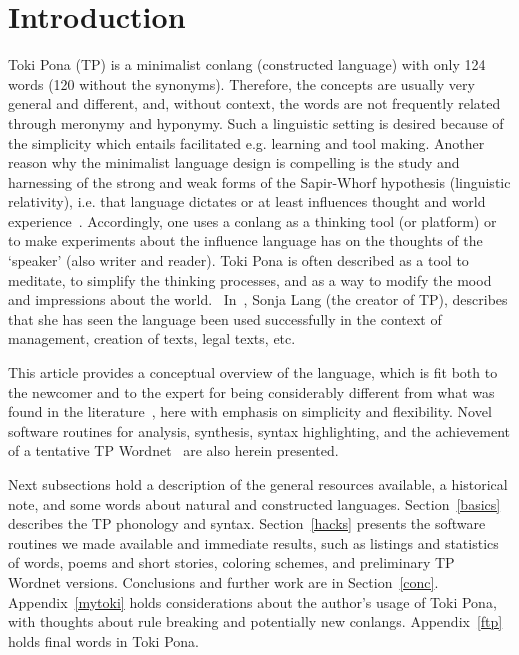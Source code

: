 \section{Introduction}\label{intro}
Toki Pona (TP) is a minimalist conlang (constructed language)
with only 124 words (120 without the synonyms).
Therefore, the concepts are usually very general and different,
and, without context, the words are not frequently related through
meronymy and hyponymy.
Such a linguistic setting is desired because of the simplicity
which entails facilitated e.g. learning and tool making.
Another reason why the minimalist language design is compelling
is the study and harnessing of the strong and weak forms of
the Sapir-Whorf hypothesis (linguistic relativity),
i.e. that language dictates or at least influences thought
and world experience~\cite{sapWho}.
Accordingly, one uses a conlang as a thinking tool (or platform)
or to make experiments about the influence language has on
the thoughts of the `speaker' (also writer and reader).
Toki Pona is often described as a tool to meditate,
to simplify the thinking processes, and as a way to modify
the mood and impressions about the world.~\cite{tpLang,kama,tp3,tp4}
In~\cite{interview}, Sonja Lang (the creator of TP),
describes that she has seen the language been used successfully
in the context of management, creation of texts, legal texts,
etc.

This article provides a conceptual overview of the language,
which is fit both to the newcomer and to the expert
for being considerably different
from what was found in the literature~\cite{tpLang,kama,memrise},
here with emphasis on simplicity and flexibility.
Novel software routines for analysis, synthesis,
syntax highlighting, and the achievement of a tentative TP
Wordnet~\cite{wordnet} are also herein presented.

Next subsections hold a description of the general resources available,
a historical note, and some words about natural and constructed languages.
Section~\ref{basics} describes the TP phonology and syntax.
Section~\ref{hacks} presents the software routines we made available
and immediate results, such as listings and statistics of words,
poems and short stories, coloring schemes, and preliminary TP Wordnet
versions.
Conclusions and further work are in Section~\ref{conc}.
Appendix~\ref{mytoki} holds considerations about the author's
usage of Toki Pona,
with thoughts about rule breaking and potentially new conlangs.
Appendix~\ref{ftp} holds final words in Toki Pona.

